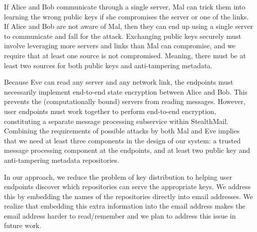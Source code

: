 If Alice and Bob communicate through a single server, Mal can trick 
them into learning the wrong public keys if she compromises 
the server or one of the links. If Alice and Bob are not aware of Mal, then they can end up using a single server to communicate and fall for the attack. Exchanging public keys securely must involve 
leveraging more servers and links than Mal can compromise, and we require that at least one source is not compromised. Meaning, there must be at least two sources for both public keys and 
anti-tampering metadata.

Because Eve can read any server and any network link, the endpoints 
must necessarily implement end-to-end state encryption between Alice 
and Bob.  This prevents the (computationally bound) servers from 
reading messages. However, user endpoints must work together 
to perform end-to-end encryption, constituting a separate message processing subservice 
within StealthMail. Combining the requirements of possible attacks by both Mal and Eve implies that we need at least three components in the 
design of our system: a trusted message processing component at the 
endpoints, and at least two public key and anti-tampering metadata 
repositories.

In our approach, we reduce the problem of key distribution to helping user endpoints discover which repositories can serve the appropriate keys.  
We address this by embedding the names of the repositories directly into email addresses. We realize that embedding this extra information 
into the email address makes the email address harder to read/remember 
and we plan to address this issue in future work. 
